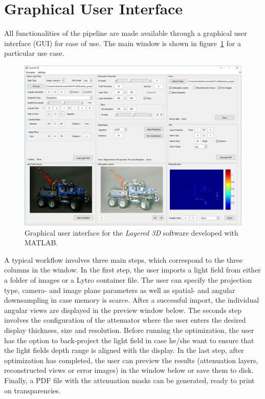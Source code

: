 \section{Graphical User Interface}
\label{sec:GUI}

All functionalities of the pipeline are made available through a graphical user interface \mbox{(GUI)} for ease of use.
The main window is shown in figure~\ref{fig:gui_overview} for a particular use case.
\begin{figure}[tb]
	\includegraphics[width = \linewidth]{../Figures/gui/overview}
	\caption[Graphical user interface]
			{Graphical user interface for the \emph{Layered 3D} software developed with MATLAB.}
	\label{fig:gui_overview}
\end{figure}
A typical workflow involves three main steps, which correspond to the three columns in the window.
In the first step, the user imports a light field from either a folder of images or a \mbox{Lytro} container file.
The user can specify the projection type, camera- and image plane parameters as well as spatial- and angular downsampling in case memory is scarce.
After a successful import, the individual angular views are displayed in the preview window below.
The seconds step involves the configuration of the attenuator where the user enters the desired display thickness, size and resolution.
Before running the optimization, the user has the option to back-project the light field in case he/she want to ensure that the light fields depth range is aligned with the display.
In the last step, after optimization has completed, the user can preview the results (attenuation layers, reconstructed views or error images) in the window below or save them to disk.
Finally, a \mbox{PDF} file with the attenuation masks can be generated, ready to print on transparencies.

